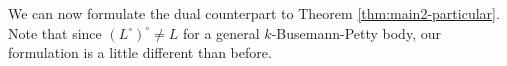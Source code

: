 \documentclass[12pt,oneside]{amsart}
\theoremstyle{definition}
\theoremstyle{remark}
\theoremstyle{proof}
\numberwithin{equation}{section}
\newcommand{\norm}[1]{\left\Vert#1\right\Vert}
\newcommand{\brac}[1]{\left(#1\right)}
\newcommand{\Real}{\mathbb{R}}
\newcommand{\Lk}{\mathcal{L}_k}
\newcommand{\Vol}[1]{\textnormal{Vol} (#1)}
\begin{document}
%

We can now formulate the dual counterpart to Theorem
\ref{thm:main2-particular}. Note that since $(L^\circ)^\circ \neq
L$ for a general $k$-Busemann-Petty body, our formulation is a
little different than before.
\end{document}
